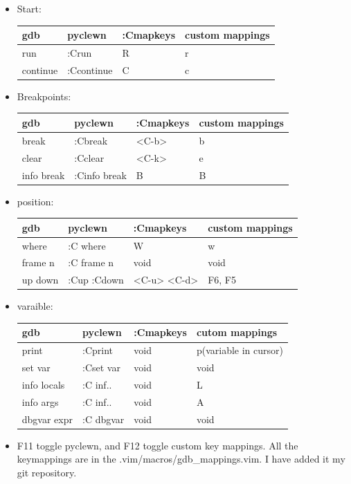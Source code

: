 \documentclass[a4paper,12pt,twoside]{book}
\begin{document}
\begin{itemize}
\item Start: \\
\begin{tabular}{p{}|p{}|p{}|p{}}
		\hline 
		gdb & pyclewn & :Cmapkeys & custom mappings \\
		\hline
		run & :Crun & R & r\\
		\hline 
		continue & :Ccontinue & C& c\\
		\hline 
		\end{tabular}
		
\item Breakpoints: \\
\begin{tabular}{p{}|p{}|p{}|p{}}
		\hline 
		gdb & pyclewn & :Cmapkeys & custom mappings \\
		\hline
		break & :Cbreak & <C-b> & b\\
		\hline 
		clear & :Cclear & <C-k>& e\\
		\hline 
		info break & :Cinfo break & B& B \\
		\hline
		\end{tabular}

\item position: \\
\begin{tabular}{p{}|p{}|p{}|p{}}
		\hline 
		gdb & pyclewn & :Cmapkeys & custom mappings \\
		\hline
		where & :C where & W & w\\
		\hline 
		frame n & :C frame n & void &void \\
		\hline 
		up down & :Cup :Cdown & <C-u> <C-d> &F6, F5\\
		\hline
		\end{tabular}

\item varaible: \\
\begin{tabular}{p{}|p{}|p{}|p{}}
		\hline 
		gdb & pyclewn & :Cmapkeys & cutom mappings\\
		\hline
		print &:Cprint  &void & p(variable in cursor) \\
		\hline 
		set var  & :Cset var & void& void \\
		\hline 
		info locals & :C inf.. & void & L\\
		\hline
		info args & :C inf.. & void & A \\
		\hline
		dbgvar expr & :C dbgvar & void& void \\
		\hline 
		\end{tabular}

\item F11 toggle pyclewn, and F12 toggle custom key mappings. All the keymappings are in the .vim/macros/gdb\_mappings.vim. I have added it my git repository. 
\end{itemize}
\end{document}
